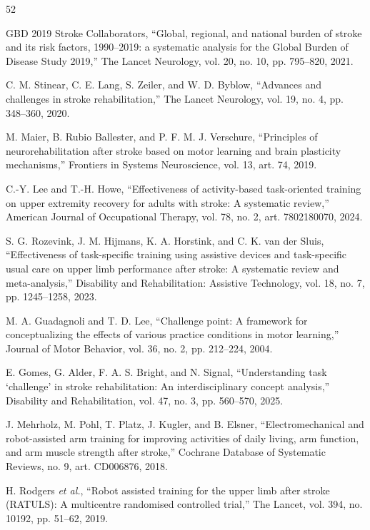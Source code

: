 \documentclass[journal,twoside,web]{ieeecolor2}
\begin{document}
\begin{thebibliography}{52}

 GBD 2019 Stroke Collaborators, ``Global, regional, and national burden of stroke and its risk factors, 1990--2019: a systematic analysis for the Global Burden of Disease Study 2019,'' The Lancet Neurology, vol. 20, no. 10, pp. 795--820, 2021.

 C. M. Stinear, C. E. Lang, S. Zeiler, and W. D. Byblow, ``Advances and challenges in stroke rehabilitation,'' The Lancet Neurology, vol. 19, no. 4, pp. 348--360, 2020.

 M. Maier, B. Rubio Ballester, and P. F. M. J. Verschure, ``Principles of neurorehabilitation after stroke based on motor learning and brain plasticity mechanisms,'' Frontiers in Systems Neuroscience, vol. 13, art. 74, 2019.

 C.-Y. Lee and T.-H. Howe, ``Effectiveness of activity-based task-oriented training on upper extremity recovery for adults with stroke: A systematic review,'' American Journal of Occupational Therapy, vol. 78, no. 2, art. 7802180070, 2024.

 S. G. Rozevink, J. M. Hijmans, K. A. Horstink, and C. K. van der Sluis, ``Effectiveness of task-specific training using assistive devices and task-specific usual care on upper limb performance after stroke: A systematic review and meta-analysis,'' Disability and Rehabilitation: Assistive Technology, vol. 18, no. 7, pp. 1245--1258, 2023.

 M. A. Guadagnoli and T. D. Lee, ``Challenge point: A framework for conceptualizing the effects of various practice conditions in motor learning,'' Journal of Motor Behavior, vol. 36, no. 2, pp. 212--224, 2004.

 E. Gomes, G. Alder, F. A. S. Bright, and N. Signal, ``Understanding task `challenge' in stroke rehabilitation: An interdisciplinary concept analysis,'' Disability and Rehabilitation, vol. 47, no. 3, pp. 560--570, 2025.

 J. Mehrholz, M. Pohl, T. Platz, J. Kugler, and B. Elsner, ``Electromechanical and robot-assisted arm training for improving activities of daily living, arm function, and arm muscle strength after stroke,'' Cochrane Database of Systematic Reviews, no. 9, art. CD006876, 2018.

 H. Rodgers \emph{et al.}, ``Robot assisted training for the upper limb after stroke (RATULS): A multicentre randomised controlled trial,'' The Lancet, vol. 394, no. 10192, pp. 51--62, 2019.


\end{thebibliography}
\end{document}
